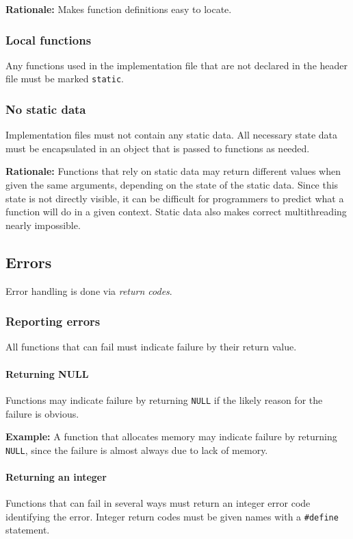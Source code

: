 \documentclass[]{article}
\begin{document}
\textbf{Rationale:} Makes function definitions easy to locate. 

\subsubsection{Local functions}
Any functions used in the implementation file that are not declared in the header file must be marked \verb'static'.

\subsubsection{No static data}
Implementation files must not contain any static data. All necessary state data must be encapsulated in an object that is passed to functions as needed.

\textbf{Rationale:} Functions that rely on static data may return different values when given the same arguments, depending on the state of the static data. Since this state is not directly visible, it can be difficult for programmers to predict what a function will do in a given context. Static data also makes correct multithreading nearly impossible.


\subsection{Errors}
Error handling is done via \emph{return codes}. 

\subsubsection{Reporting errors}
All functions that can fail must indicate failure by their return value.

\paragraph{Returning NULL}
Functions may indicate failure by returning \verb'NULL' if the likely reason for the failure is obvious.

\textbf{Example:} A function that allocates memory may indicate failure by returning \verb'NULL', since the failure is almost always due to lack of memory.

\paragraph{Returning an integer}
Functions that can fail in several ways must return an integer error code identifying the error. Integer return codes must be given names with a \verb'#define' statement. 
\end{document}

